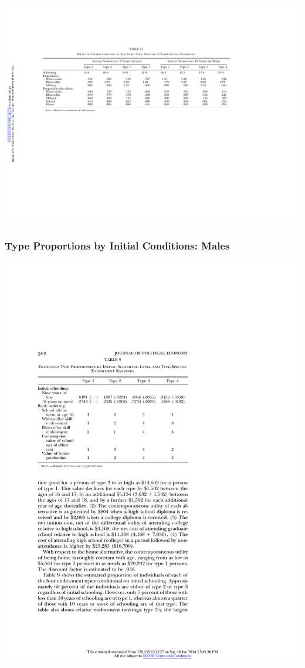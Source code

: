 \begin{frame}
	\includegraphics{tab-figs/table11_1997_footer}	
\end{frame}

\begin{frame}
	\frametitle{Type Proportions by Initial Conditions: Males}
	\includegraphics{tab-figs/table9_1997}	
\end{frame}

